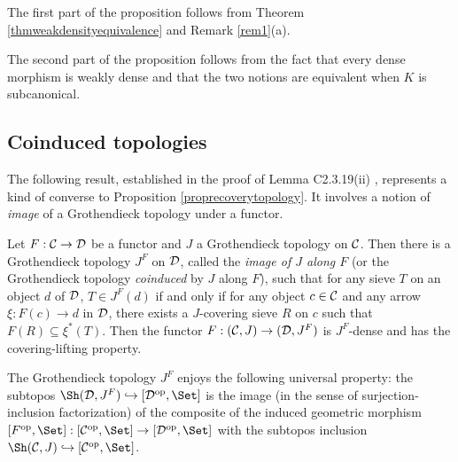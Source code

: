 \documentclass[a4paper,12pt]{article}
\begin{document}
\begin{proofs}
	The first part of the proposition follows from Theorem \ref{thmweakdensityequivalence} and Remark \ref{rem1}(a).
	
	The second part of the proposition follows from the fact that every dense morphism is weakly dense and that the two notions are equivalent when $K$ is subcanonical.
\end{proofs}


\subsection{Coinduced topologies}

The following result, established in the proof of Lemma C2.3.19(ii) \cite{El}, represents a kind of converse to Proposition \ref{proprecoverytopology}. It involves a notion of \emph{image} of a Grothendieck topology under a functor.

\begin{proposition}\label{propimagetopology}
	Let $F:{\cal C}\to {\cal D}$ be a functor and $J$ a Grothendieck topology on $\cal C$. Then there is a Grothendieck topology $J^{F}$ on $\cal D$, called the \emph{image of $J$ along $F$} (or the Grothendieck topology \emph{coinduced} by $J$ along $F$), such that for any sieve $T$ on an object $d$ of $\cal D$, $T\in J^{F}(d)$ if and only if for any object $c\in {\cal C}$ and any arrow $\xi:F(c)\to d$ in $\cal D$, there exists a $J$-covering sieve $R$ on $c$ such that $F(R)\subseteq \xi^{\ast}(T)$. Then the functor $F:({\cal C}, J)\to ({\cal D}, J^{F})$ is $J^{F}$-dense and has the covering-lifting property.
	
	The Grothendieck topology $J^{F}$ enjoys the following universal property: the subtopos $\Sh({\cal D}, J^{F})\hookrightarrow [{\cal D}^{\textup{op}}, \Set]$ is the image (in the sense of surjection-inclusion factorization) of the composite of the induced geometric morphism $[F^{\textup{op}}, \Set]:[{\cal C}^{\textup{op}}, \Set]\to [{\cal D}^{\textup{op}}, \Set]$ with the subtopos inclusion $\Sh({\cal C}, J)\hookrightarrow [{\cal C}^{\textup{op}}, \Set]$.
\end{proposition}
	
\end{document}
